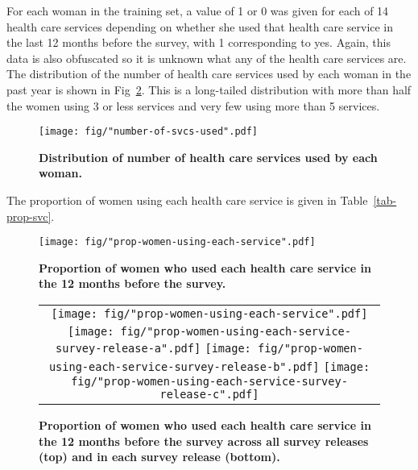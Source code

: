 \documentclass{article}\usepackage[]{graphicx}\usepackage[]{color}
\begin{document}
For each woman in the training set, a value of 1 or 0 was given for each of 14 health care services depending on whether she used that health care service in the last 12 months before the survey, with 1 corresponding to yes. Again, this data is also obfuscated so it is unknown what any of the health care services are. The distribution of the number of health care services used by each woman in the past year is shown in Fig~\ref{fig-num-svcs}. This is a long-tailed distribution with more than half the women using 3 or less services and very few using more than 5 services.

\begin{figure}[htbp]
    \begin{center}
  	\texttt{[image: fig/"number-of-svcs-used".pdf]}
		\caption{\textbf{Distribution of number of health care services used by each woman.}}
		\label{fig-num-svcs}
  \end{center}
\end{figure}

The proportion of women using each health care service is given in Table~\ref{tab-prop-svc}. 



\begin{figure}[htbp]
    \begin{center}
    \texttt{[image: fig/"prop-women-using-each-service".pdf]}
		\caption{\textbf{Proportion of women who used each health care service in the 12 months before the survey.}}
		\label{fig-num-svcs}
  \end{center}
\end{figure}

\begin{figure}[htbp]
  \begin{center}
  \begin{tabular}{|c|}
		\texttt{[image: fig/"prop-women-using-each-service".pdf]} \\
		\texttt{[image: fig/"prop-women-using-each-service-survey-release-a".pdf]}
    \texttt{[image: fig/"prop-women-using-each-service-survey-release-b".pdf]}
    \texttt{[image: fig/"prop-women-using-each-service-survey-release-c".pdf]}
    \end{tabular}
		\caption{\textbf{Proportion of women who used each health care service in the 12 months before the survey across all survey releases (top) and in each survey release (bottom).}}
		\label{fig-prop-svcs}
	\end{center}
\end{figure}
\end{document}
